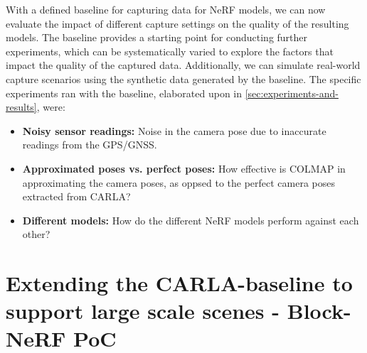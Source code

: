 With a defined baseline for capturing data for NeRF models, we can now evaluate the impact of different capture settings on the quality of the resulting models. The baseline provides a starting point for conducting further experiments, which can be systematically varied to explore the factors that impact the quality of the captured data. Additionally, we can simulate real-world capture scenarios using the synthetic data generated by the baseline. The specific experiments ran with the baseline, elaborated upon in \autoref{sec:experiments-and-results}, were:

\begin{itemize}
    \item \textbf{Noisy sensor readings:} Noise in the camera pose due to inaccurate readings from the GPS/GNSS.
    \item \textbf{Approximated poses vs. perfect poses:} How effective is COLMAP in approximating the camera poses, as oppsed to the perfect camera poses extracted from CARLA?
    \item \textbf{Different models:} How do the different NeRF models perform against each other?
\end{itemize}




















































\section{Extending the CARLA-baseline to support large scale scenes - Block-NeRF PoC}

